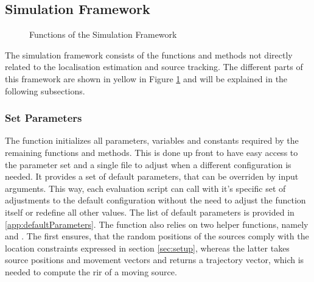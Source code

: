 \subsection{Simulation Framework}
\begin{figure}[H]
	\centering
	
	\caption{Functions of the Simulation Framework}
	\label{diag:simulationFramework}
\end{figure}

The simulation framework consists of the functions and methods not directly related to the localisation estimation and source tracking. The different parts of this framework are shown in yellow in Figure \ref{diag:simulationFramework} and will be explained in the following subsections.

\subsubsection{Set Parameters}
The  function initializes all parameters, variables and constants required by the remaining functions and methods. This is done up front to have easy access to the parameter set and a single file to adjust when a different configuration is needed. It provides a set of default parameters, that can be overriden by input arguments. This way, each evaluation script can call  with it's specific set of adjustments to the default configuration without the need to adjust the function itself or redefine all other values. The list of default parameters is provided in \ref{app:defaultParameters}.
The function also relies on two helper functions, namely  and . The first ensures, that the random positions of the sources comply with the location constraints expressed in section \ref{sec:setup}, whereas the latter takes source positions and movement vectors and returns a trajectory vector, which is needed to compute the \gls{rir} of a moving source.


